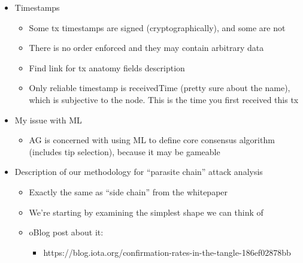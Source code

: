 \documentclass{article}
\begin{document}
\begin{itemize}
	\item Timestamps
	\begin{itemize}
		\item Some tx timestamps are signed (cryptographically), and some are not
		\item There is no order enforced and they may contain arbitrary data
		\item Find link for tx anatomy fields description
		\item Only reliable timestamp is receivedTime (pretty sure about the name), which is subjective to the node. This is the time you first received this tx
	\end{itemize}
\end{itemize}
\begin{itemize}
	\item My issue with ML
	\begin{itemize}
		\item AG is concerned with using ML to define core consensus algorithm (includes tip selection), because it may be gameable
	\end{itemize}
\end{itemize}

\begin{itemize}
	\item Description of our methodology for “parasite chain” attack analysis
	\begin{itemize}
		\item Exactly the same as “side chain” from the whitepaper
		\item We’re starting by examining the simplest shape we can think of
		\item oBlog post about it:
		\begin{itemize}
			\item https://blog.iota.org/confirmation-rates-in-the-tangle-186ef02878bb
		\end{itemize}
	\end{itemize}
\end{itemize}
\end{document}
